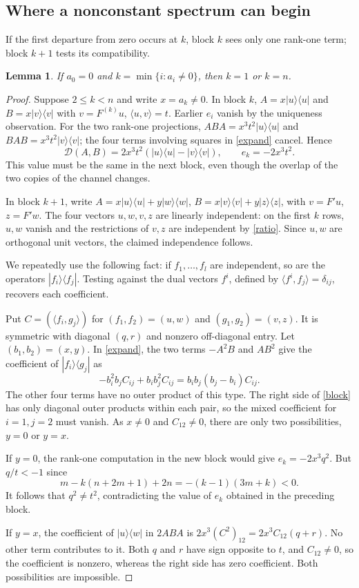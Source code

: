\documentclass[11pt]{article}
\newtheorem{lemma}[theorem]{Lemma}
\newcommand{\DD}{\mathcal D}
\newcommand{\pr}[1]{|#1\rangle\langle#1|}
\begin{document}
\subsection{Where a nonconstant spectrum can begin}
If the first departure from zero occurs at $k$, block $k$ sees only one rank-one term; block $k+1$ tests its compatibility.
\begin{lemma}\label{first}
If $a_0=0$ and $k=\min\{i:a_i\ne0\}$, then $k=1$ or $k=n$.
\end{lemma}
\begin{proof}
Suppose $2\le k<n$ and write $x=a_k\ne0$. In block $k$, $A=x\pr{u}$ and $B=x\pr{v}$ with $v=F^{(k)}u$, $\langle u,v\rangle=t$. Earlier $e_i$ vanish by the uniqueness observation. For the two rank-one projections, $ABA=x^3t^2\pr{u}$ and $BAB=x^3t^2\pr{v}$; the four terms involving squares in \eqref{expand} cancel. Hence
\[
 \DD(A,B)=2x^3t^2(\pr{u}-\pr{v}),\qquad e_k=-2x^3t^2.
\]
This value must be the same in the next block, even though the overlap of the two copies of the channel changes.

In block $k+1$, write $A=x\pr{u}+y\pr{w}$, $B=x\pr{v}+y\pr{z}$, with $v=F'u$, $z=F'w$. The four vectors $u,w,v,z$ are linearly independent: on the first $k$ rows, $u,w$ vanish and the restrictions of $v,z$ are independent by \eqref{ratio}. Since $u,w$ are orthogonal unit vectors, the claimed independence follows.

We repeatedly use the following fact: if $f_1,\ldots,f_l$ are independent, so are the operators $|f_i\rangle\langle f_j|$. Testing against the dual vectors $f^i$, defined by $\langle f^i,f_j\rangle=\delta_{ij}$, recovers each coefficient.

Put $C=(\langle f_i,g_j\rangle)$ for $(f_1,f_2)=(u,w)$ and $(g_1,g_2)=(v,z)$. It is symmetric with diagonal $(q,r)$ and nonzero off-diagonal entry. Let $(b_1,b_2)=(x,y)$. In \eqref{expand}, the two terms $-A^2B$ and $AB^2$ give the coefficient of $|f_i\rangle\langle g_j|$ as
\[
 -b_i^2 b_j C_{ij}+b_i b_j^2 C_{ij}
 =b_i b_j(b_j-b_i)C_{ij}.
\]
The other four terms have no outer product of this type. The right side of \eqref{block} has only diagonal outer products within each pair, so the mixed coefficient for $i=1,j=2$ must vanish. As $x\ne0$ and $C_{12}\ne0$, there are only two possibilities, $y=0$ or $y=x$.

If $y=0$, the rank-one computation in the new block would give $e_k=-2x^3q^2$. But $q/t<-1$ since
\[
 m-k(n+2m+1)+2n=-(k-1)(3m+k)<0.
\]
It follows that $q^2\ne t^2$, contradicting the value of $e_k$ obtained in the preceding block.

If $y=x$, the coefficient of $|u\rangle\langle w|$ in $2ABA$ is $2x^3(C^2)_{12}=2x^3C_{12}(q+r)$. No other term contributes to it. Both $q$ and $r$ have sign opposite to $t$, and $C_{12}\ne0$, so the coefficient is nonzero, whereas the right side has zero coefficient. Both possibilities are impossible.
\end{proof}
\end{document}
